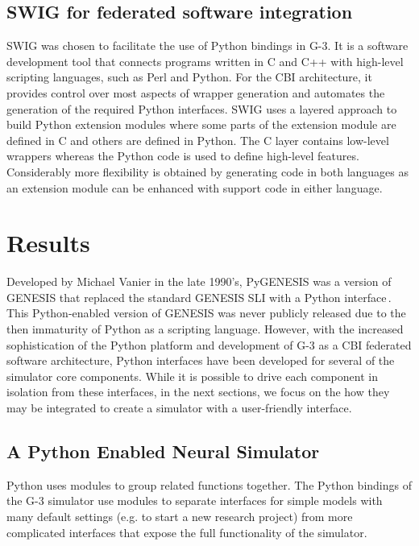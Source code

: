 \documentclass[12pt]{article}
\begin{document}
\subsection{SWIG for federated software integration}

SWIG was chosen to facilitate the use of Python bindings in G-3. It is
a software development tool that connects programs written in C and
C++ with high-level scripting languages, such as Perl and Python. For
the CBI architecture, it provides control over most aspects of wrapper
generation and automates the generation of the required Python
interfaces. SWIG uses a layered approach to build Python extension
modules where some parts of the extension module are defined in C and
others are defined in Python. The C layer contains low-level wrappers
whereas the Python code is used to define high-level features.
Considerably more flexibility is obtained by generating code in both
languages as an extension module can be enhanced with support code in
either language.

\section{Results}

Developed by Michael Vanier in the late 1990's, PyGENESIS was a
version of GENESIS that replaced the standard GENESIS SLI with a
Python interface\,\cite{vanier97:_genes_python}.  This Python-enabled
version of GENESIS was never publicly released due to the then
immaturity of Python as a scripting language.  However, with the
increased sophistication of the Python platform and development of G-3
as a CBI federated software architecture, Python interfaces have been
developed for several of the simulator core components.  While it is
possible to drive each component in isolation from these interfaces,
in the next sections, we focus on the how they may be integrated to
create a simulator with a user-friendly interface.

\subsection{A Python Enabled Neural Simulator}

Python uses modules to group related functions together.  The Python
bindings of the G-3 simulator use modules to separate interfaces for
simple models with many default settings (e.g. to start a new research
project) from more complicated interfaces that expose the full
functionality of the simulator.
\end{document}
